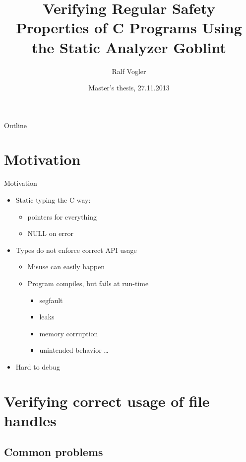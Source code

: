 \documentclass{beamer}
\title{Verifying Regular Safety Properties of C Programs Using the Static Analyzer Goblint}
\author{Ralf Vogler}
\institute[TUM] %
{
  Department of Computer Science\\
  Technische Universit\"at M\"unchen}
\date{Master's thesis, 27.11.2013}
\begin{document}
\begin{frame}
  \titlepage
\end{frame}

\begin{frame}{Outline}
  \tableofcontents
\end{frame}


\section{Motivation}

\begin{frame}{Motivation}
\begin{itemize}
\item Static typing the C way:
	\begin{itemize}
	\item pointers for everything
	\item NULL on error
	\end{itemize}
\item Types do not enforce correct API usage
	\begin{itemize}
	\item Misuse can easily happen
	\item Program compiles, but fails at run-time
		\begin{itemize}
		\item segfault
		\item leaks
		\item memory corruption
		\item unintended behavior \ldots
		\end{itemize}
	\end{itemize}
	\item Hard to debug
\end{itemize}
\end{frame}


\section{Verifying correct usage of file handles}

\subsection{Common problems}
\end{document}
